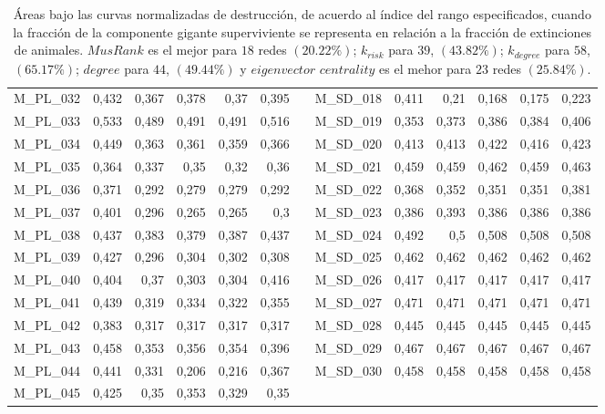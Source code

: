\begin{table}[htbp]
\begin{adjustbox}{angle=90}
\begin{tabular}{lrrrrrrrrrrrr}
    M\_PL\_032 & 0,432 & 0,367 & 0,378 & 0,37 & 0,395 &      & M\_SD\_018 & 0,411 & 0,21 & 0,168 & 0,175 & 0,223 \\
    M\_PL\_033 & 0,533 & 0,489 & 0,491 & 0,491 & 0,516 &      & M\_SD\_019 & 0,353 & 0,373 & 0,386 & 0,384 & 0,406 \\
    M\_PL\_034 & 0,449 & 0,363 & 0,361 & 0,359 & 0,366 &      & M\_SD\_020 & 0,413 & 0,413 & 0,422 & 0,416 & 0,423 \\
    M\_PL\_035 & 0,364 & 0,337 & 0,35 & 0,32 & 0,36 &      & M\_SD\_021 & 0,459 & 0,459 & 0,462 & 0,459 & 0,463 \\
    M\_PL\_036 & 0,371 & 0,292 & 0,279 & 0,279 & 0,292 &      & M\_SD\_022 & 0,368 & 0,352 & 0,351 & 0,351 & 0,381 \\
    M\_PL\_037 & 0,401 & 0,296 & 0,265 & 0,265 & 0,3  &      & M\_SD\_023 & 0,386 & 0,393 & 0,386 & 0,386 & 0,386 \\
    M\_PL\_038 & 0,437 & 0,383 & 0,379 & 0,387 & 0,437 &      & M\_SD\_024 & 0,492 & 0,5  & 0,508 & 0,508 & 0,508 \\
    M\_PL\_039 & 0,427 & 0,296 & 0,304 & 0,302 & 0,308 &      & M\_SD\_025 & 0,462 & 0,462 & 0,462 & 0,462 & 0,462 \\
    M\_PL\_040 & 0,404 & 0,37 & 0,303 & 0,304 & 0,416 &      & M\_SD\_026 & 0,417 & 0,417 & 0,417 & 0,417 & 0,417 \\
    M\_PL\_041 & 0,439 & 0,319 & 0,334 & 0,322 & 0,355 &      & M\_SD\_027 & 0,471 & 0,471 & 0,471 & 0,471 & 0,471 \\
    M\_PL\_042 & 0,383 & 0,317 & 0,317 & 0,317 & 0,317 &      & M\_SD\_028 & 0,445 & 0,445 & 0,445 & 0,445 & 0,445 \\
    M\_PL\_043 & 0,458 & 0,353 & 0,356 & 0,354 & 0,396 &      & M\_SD\_029 & 0,467 & 0,467 & 0,467 & 0,467 & 0,467 \\
    M\_PL\_044 & 0,441 & 0,331 & 0,206 & 0,216 & 0,367 &      & M\_SD\_030 & 0,458 & 0,458 & 0,458 & 0,458 & 0,458 \\
    M\_PL\_045 & 0,425 & 0,35 & 0,353 & 0,329 & 0,35 &      &      &      &      &      &      &  \\
    \bottomrule
    \end{tabular}%
    \end{adjustbox}
    \caption{\label{table:juanma_destruction} Áreas bajo las curvas normalizadas de destrucción, de acuerdo al índice del rango especificados, cuando la fracción de la componente gigante superviviente se representa en relación a la fracción de extinciones de animales. $MusRank$ es el mejor para $18$ redes $(20.22\%)$;
$k_{risk}$ para $39$, $(43.82\%)$; $k_{degree}$ para $58$, $(65.17\%)$; $degree$ para $44$, $(49.44\%)$ y
$eigenvector$ $centrality$ es el mehor para $23$ redes $(25.84\%)$.}
\end{table}%




